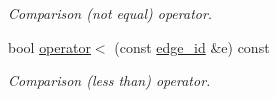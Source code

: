 \begin{DoxyCompactItemize}
\begin{DoxyCompactList}\small\item\em Comparison (not equal) operator. \end{DoxyCompactList}\item 
bool \hyperlink{structmerlin_1_1edge__id_a49ad1cddafba83aa3d5aab55d4ca6bb5}{operator$<$} (const \hyperlink{structmerlin_1_1edge__id}{edge\+\_\+id} \&e) const \hypertarget{structmerlin_1_1edge__id_a49ad1cddafba83aa3d5aab55d4ca6bb5}{}\label{structmerlin_1_1edge__id_a49ad1cddafba83aa3d5aab55d4ca6bb5}

\begin{DoxyCompactList}\small\item\em Comparison (less than) operator. \end{DoxyCompactList}\end{DoxyCompactItemize}
